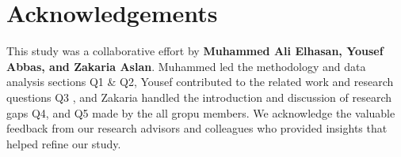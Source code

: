 \section{Acknowledgements}
This study was a collaborative effort by \textbf{Muhammed Ali Elhasan, Yousef Abbas, and Zakaria Aslan}. Muhammed led the methodology and data analysis sections Q1 & Q2, Yousef contributed to the related work and research questions Q3 , and Zakaria handled the introduction and discussion of research gaps Q4, and Q5 made by the all gropu members. We acknowledge the valuable feedback from our research advisors and colleagues who provided insights that helped refine our study.
